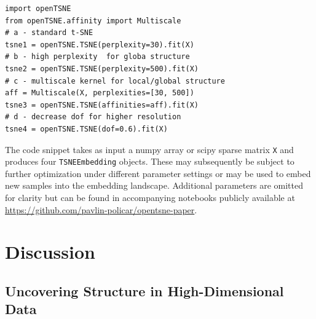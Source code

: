 \documentclass[twocolumn]{bmcart}
\begin{document}
\begin{verbatim}
import openTSNE
from openTSNE.affinity import Multiscale
# a - standard t-SNE
tsne1 = openTSNE.TSNE(perplexity=30).fit(X)
# b - high perplexity  for globa structure
tsne2 = openTSNE.TSNE(perplexity=500).fit(X)
# c - multiscale kernel for local/global structure
aff = Multiscale(X, perplexities=[30, 500])
tsne3 = openTSNE.TSNE(affinities=aff).fit(X)
# d - decrease dof for higher resolution
tsne4 = openTSNE.TSNE(dof=0.6).fit(X)
\end{verbatim}

\noindent The code snippet takes as input a \textsf{numpy} array or
\textsf{scipy} sparse matrix \texttt{X} and produces four
\texttt{TSNEEmbedding} objects. These may subsequently be subject to further
optimization under different parameter settings or may be used to embed new
samples into the embedding landscape. Additional parameters are omitted for
clarity but can be found in accompanying notebooks publicly available at
\url{https://github.com/pavlin-policar/opentsne-paper}.

\section*{Discussion}

\subsection*{Uncovering Structure in High-Dimensional Data}
\end{document}
